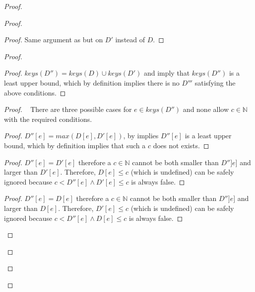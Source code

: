 \documentclass[9pt, oneside]{article}   	%
\begin{document}
\begin{proof}
\begin{proof}
		\begin{proof}
			Same argument as  but on $D'$ instead of $D$.
		\end{proof}
		
		\begin{proof}
			\begin{proof}
				$\textit{keys}(D'') = \textit{keys}(D) \cup \textit{keys}(D')$ and  imply that $\textit{keys}(D'')$ is a least upper bound, which by definition implies there is no $D'''$ satisfying the above conditions.
			\end{proof}
			
			\begin{proof}
				\pfsketch~ There are three possible cases for $e \in \textit{keys}(D'')$ and none allow $c \in \mathds{N}$ with the required conditions.
				\begin{proof}
					$D''[e] = \textit{max}(D[e], D'[e])$, by  implies $D''[e]$ is a least upper bound, which by definition implies that such a $c$ does not exists.
				\end{proof}
				
				\begin{proof}
					$D''[e] = D'[e]$ therefore a $c \in \mathds{N}$ cannot be both smaller than $D'']e]$ and larger than $D'[e]$. Therefore, $D[e] \leq c$ (which is undefined) can be safely ignored because $c < D''[e] \wedge D'[e] \leq c$ is always false.
				\end{proof}
				
				\begin{proof}
					$D''[e] = D[e]$ therefore a $c \in \mathds{N}$ cannot be both smaller than $D'']e]$ and larger than $D[e]$. Therefore,  $D'[e] \leq c$ (which is undefined) can be safely ignored because $c < D''[e] \wedge D[e] \leq c$ is always false.


\end{proof}
\end{proof}
\end{proof}
\end{proof}
\end{proof}
\end{document}

